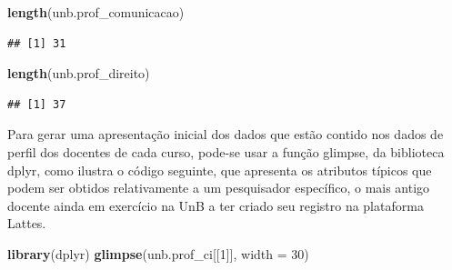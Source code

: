 \documentclass[]{article}
\newenvironment{Shaded}{\begin{snugshade}}{\end{snugshade}}
\newcommand{\KeywordTok}[1]{\textcolor[rgb]{0.13,0.29,0.53}{\textbf{#1}}}
\newcommand{\DataTypeTok}[1]{\textcolor[rgb]{0.13,0.29,0.53}{#1}}
\newcommand{\DecValTok}[1]{\textcolor[rgb]{0.00,0.00,0.81}{#1}}
\newcommand{\NormalTok}[1]{#1}
\begin{document}
\begin{Shaded}
\begin{Highlighting}[]
\KeywordTok{length}\NormalTok{(unb.prof_comunicacao)}
\end{Highlighting}
\end{Shaded}

\begin{verbatim}
## [1] 31
\end{verbatim}

\begin{Shaded}
\begin{Highlighting}[]
\KeywordTok{length}\NormalTok{(unb.prof_direito)}
\end{Highlighting}
\end{Shaded}

\begin{verbatim}
## [1] 37
\end{verbatim}

Para gerar uma apresentação inicial dos dados que estão contido nos
dados de perfil dos docentes de cada curso, pode-se usar a função
glimpse, da biblioteca dplyr, como ilustra o código seguinte, que
apresenta os atributos típicos que podem ser obtidos relativamente a um
pesquisador específico, o mais antigo docente ainda em exercício na UnB
a ter criado seu registro na plataforma Lattes.

\begin{Shaded}
\begin{Highlighting}[]
\KeywordTok{library}\NormalTok{(dplyr) }
\KeywordTok{glimpse}\NormalTok{(unb.prof_ci[[}\DecValTok{1}\NormalTok{]], }\DataTypeTok{width =} \DecValTok{30}\NormalTok{)}
\end{Highlighting}
\end{Shaded}
\end{document}
